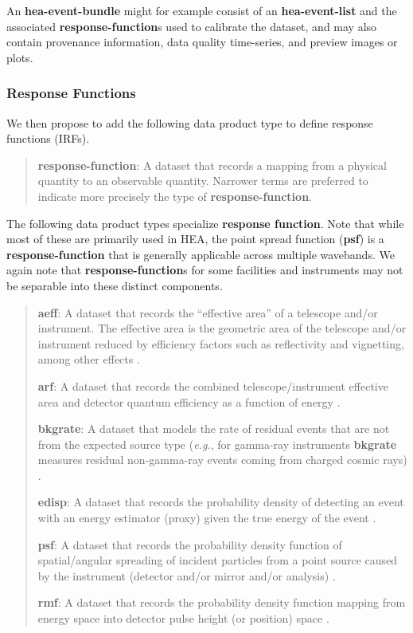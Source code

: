 \documentclass[11pt,a4paper]{ivoa}
\begin{document}
An {\bf hea-event-bundle} might for example consist of an {\bf hea-event-list} and the associated {\bf response-function}s used to calibrate the dataset, and may also contain provenance information, data quality time-series, and preview images or plots.


\subsubsection{Response Functions}
\label{sec:responsefct}

We then propose to add the following data product type to define response functions (\glspl{IRF}).

\begin{quote}
 {\bf response-function}: A dataset that records a mapping from a physical quantity to an observable quantity.  Narrower terms are preferred to indicate more precisely the type of {\bf response-function}.
 \end{quote}

The following data product types specialize {\bf response function}.  Note that while most of these are primarily used in \gls{HEA}, the point spread function ({\bf psf}) is a {\bf response-function} that is generally applicable across multiple wavebands.  We again note that {\bf response-function}s for some facilities and instruments may not be separable into these distinct components.

\begin{quote}
{\bf aeff}: A dataset that records the ``effective area'' of a telescope and/or instrument.  The effective area is the geometric area of the telescope and/or instrument reduced by efficiency factors such as reflectivity and vignetting, among other effects \citep{deil_2022_7304668}.

{\bf arf}: A dataset that records the combined telescope/instrument effective area and detector quantum efficiency as a function of energy \citep{ogip_spectrum_1998}.

{\bf bkgrate}: A dataset that models the rate of residual events that are not from the expected source type ({\em e.g.\/}, for gamma-ray instruments {\bf bkgrate} measures residual non-gamma-ray events coming from charged cosmic rays)  \citep{deil_2022_7304668}.

{\bf edisp}: A dataset that records the probability density of detecting an event with an energy estimator (proxy) given the true energy of the event \citep{deil_2022_7304668}.

{\bf psf}: A dataset that records the probability density function of spatial/angular spreading of incident particles from a point source caused by the instrument (detector and/or mirror and/or analysis) \citep{deil_2022_7304668, ogip_psf_2011}.

{\bf rmf}: A dataset that records the probability density function mapping from energy space into detector pulse height (or position) space \citep{ogip_spectrum_1998}.
\end{quote}
\end{document}
